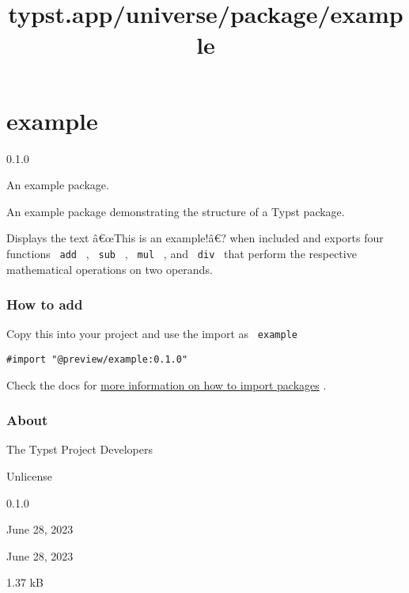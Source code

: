 \title{typst.app/universe/package/example}

\label{banner}
\section{example}\label{example}

{ 0.1.0 }

An example package.

\label{readme}
An example package demonstrating the structure of a Typst package.

Displays the text â€œThis is an example!â€? when included and exports
four functions \texttt{\ add\ } , \texttt{\ sub\ } , \texttt{\ mul\ } ,
and \texttt{\ div\ } that perform the respective mathematical operations
on two operands.

\subsubsection{How to add}\label{how-to-add}

Copy this into your project and use the import as \texttt{\ example\ }

\begin{verbatim}
#import "@preview/example:0.1.0"
\end{verbatim}



Check the docs for
\href{https://typst.app/docs/reference/scripting/\#packages}{more
information on how to import packages} .

\subsubsection{About}\label{about}

\begin{description}
\tightlist
\item[Author :]
The Typst Project Developers
\item[License:]
Unlicense
\item[Current version:]
0.1.0
\item[Last updated:]
June 28, 2023
\item[First released:]
June 28, 2023
\item[Archive size:]
1.37 kB
\href{https://packages.typst.org/preview/example-0.1.0.tar.gz}{\pandocbounded{}}
\end{description}

